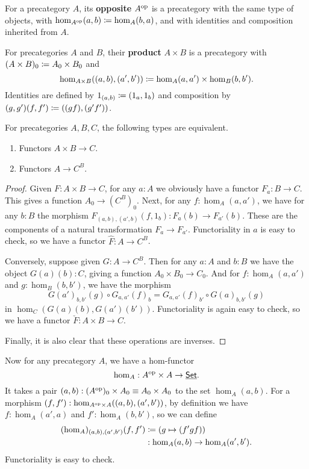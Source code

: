 \begin{defn}
  For a precategory $A$, its \textbf{opposite} $A^{\textrm{op}}$ is a precategory with the same type of objects, with $\hom_{A^{\textrm{op}}}(a,b) \coloneqq \hom_A(b,a)$, and with identities and composition inherited from $A$.
\end{defn}

\begin{defn}
  For precategories $A$ and $B$, their \textbf{product} $A\times B$ is a precategory with $(A\times B)_0 \coloneqq A_0 \times B_0$ and
  \[\hom_{A\times B}((a,b),(a',b')) \coloneqq \hom_A(a,a') \times \hom_B(b,b').\]
  Identities are defined by $1_{(a,b)}\coloneqq (1_a,1_b)$ and composition by $(g,g')(f,f') \coloneqq ((gf),(g'f'))$.
\end{defn}

\begin{lem}\label{ct:functorexpadj}
  For precategories $A,B,C$, the following types are equivalent.
  \begin{enumerate}
  \item Functors $A\times B\to C$.
  \item Functors $A\to C^B$.
  \end{enumerate}
\end{lem}
\begin{proof}
  Given $F:A\times B\to C$, for any $a:A$ we obviously have a functor $F_a : B\to C$.
  This gives a function $A_0 \to (C^B)_0$.
  Next, for any $f:\hom_A(a,a')$, we have for any $b:B$ the morphism $F_{(a,b),(a',b)}(f,1_b):F_a(b) \to F_{a'}(b)$.
  These are the components of a natural transformation $F_a \to F_{a'}$.
  Functoriality in $a$ is easy to check, so we have a functor $\hat{F}:A\to C^B$.

  Conversely, suppose given $G:A\to C^B$.
  Then for any $a:A$ and $b:B$ we have the object $G(a)(b):C$, giving a function $A_0 \times B_0 \to C_0$.
  And for $f:\hom_A(a,a')$ and $g:\hom_B(b,b')$, we have the morphism
  \begin{equation*}
     G(a')_{b,b'}(g)\circ G_{a,a'}(f)_b = G_{a,a'}(f)_{b'} \circ  G(a)_{b,b'}(g)
  \end{equation*}
  in $\hom_C(G(a)(b), G(a')(b'))$.
  Functoriality is again easy to check, so we have a functor $\check{F}:A\times B \to C$.

  Finally, it is also clear that these operations are inverses.
\end{proof}

Now for any precategory $A$, we have a hom-functor
\[\hom_A : A^{\textrm{op}} \times A \to \underline{\mathsf{Set}}.\]
It takes a pair $(a,b): (A^{\textrm{op}})_0 \times A_0 \equiv A_0 \times A_0$ to the set $\hom_A(a,b)$.
For a morphism $(f,f') : \hom_{A^{\textrm{op}}\times A}((a,b),(a',b'))$, by definition we have $f:\hom_A(a',a)$ and $f':\hom_A(b,b')$, so we can define 
\begin{align*}
  (\hom_A)_{(a,b),(a',b')}(f,f')
  &\coloneqq (g \mapsto (f'gf))\\
  &: \hom_A(a,b) \to \hom_A(a',b').
\end{align*}
Functoriality is easy to check.

